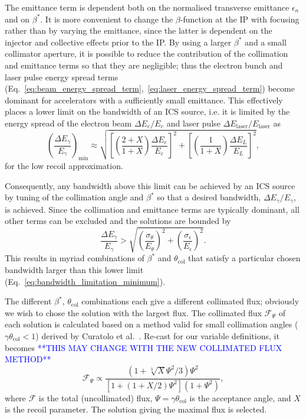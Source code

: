 \documentclass[../main.tex]{subfiles}
\begin{document}
The emittance term is dependent both on the normalised transverse emittance $\epsilon_{n}$ and on $\beta^{*}$. It is more convenient to change the $\beta$-function at the IP with focusing rather than by varying the emittance, since the latter is dependent on the injector and collective effects prior to the IP. By using a larger $\beta^{*}$ and a small collimator aperture, it is possible to reduce the contribution of the collimation and emittance terms so that they are negligible; thus the electron bunch and laser pulse energy spread terms (Eq.~\ref{eq:beam_energy_spread_term},~\ref{eq:laser_energy_spread_term}) become dominant for accelerators with a sufficiently small emittance. This effectively places a lower limit on the bandwidth of an ICS source, i.e. it is limited by the energy spread of the electron beam $\Delta E_{e}/E_{e}$ and laser pulse $\Delta E_{\mathrm{laser}}/E_{\mathrm{laser}}$ as 
\begin{equation}
\left(\frac{\Delta E_{\gamma}}{E_{\gamma}}\right)_{\mathrm{min}} \approx \sqrt{\left[\left(\frac{2+X}{1+X}\right)\frac{\Delta E_{e}}{E_{e}}\right]^{2} + \left[\left(\frac{1}{1+X}\right)\frac{\Delta E_{L}}{E_{L}}\right]^{2}},
\label{eq:bandwidth_limitation_minimum}
\end{equation}
for the low recoil approximation.

Consequently, any bandwidth above this limit can be achieved by an ICS source by tuning of the collimation angle and $\beta^*$ so that a desired bandwidth, $\Delta E_{\gamma}/E_{\gamma}$, is achieved. Since the collimation and emittance terms are typically dominant, all other terms can be excluded and the solutions are bounded by
\begin{equation}
\frac{\Delta E_{\gamma}}{E_{\gamma}} > \sqrt{\left(\frac{ \sigma_{\theta}}{E_{\theta}}\right)^{2}+\left(\frac{\sigma_{\epsilon}}{E_{\epsilon}}\right)^{2}}.    
\end{equation}
This results in myriad combinations of $\beta^{*}$ and $\theta_{\mathrm{col}}$ that satisfy a particular chosen bandwidth larger than this lower limit (Eq.~\ref{eq:bandwidth_limitation_minimum}).

The different $\beta^{*}$, $\theta_{\mathrm{col}}$ combinations each give a different collimated flux; obviously we wish to chose the solution with the largest flux. The collimated flux $\mathcal{F}_{\Psi}$ of each solution is calculated based on a method valid for small collimation angles ($\gamma\theta_{\mathrm{col}} < 1$) derived by Curatolo et al.~\cite{curatolo2017analytical}. Re-cast for our variable definitions, it becomes
\textcolor{blue}{**THIS MAY CHANGE WITH THE NEW COLLIMATED FLUX METHOD**}
\begin{equation}
\mathcal{F}_{\Psi}\propto \frac{\left(1+\sqrt[3]{X}\Psi^{2}/3\right)\Psi^{2}}{\left[1+\left(1+X/2\right)\Psi^{2}\right]\left(1+\Psi^{2}\right)}, 
\label{eq:curatolo_collimated_flux}
\end{equation}
where $\mathcal{F}$ is the total (uncollimated) flux, $\Psi = \gamma\theta_{\mathrm{col}}$ is the acceptance angle, and $X$ is the recoil parameter. The solution giving the maximal flux is selected.
\end{document}

